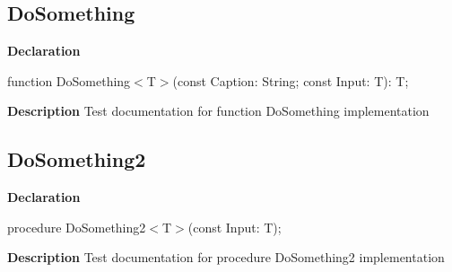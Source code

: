\documentclass{report}
\begin{document}
\subsection*{DoSomething}
\begin{list}{}{
\setlength{\itemindent}{0cm}
\setlength{\listparindent}{0cm}
\setlength{\leftmargin}{\evensidemargin}
\addtolength{\leftmargin}{\tmplength}
\settowidth{\labelsep}{X}
\addtolength{\leftmargin}{\labelsep}
\setlength{\labelwidth}{\tmplength}
}
\begin{flushleft}
\item[\textbf{Declaration}\hfill]
\begin{ttfamily}
function DoSomething{$<$}T{$>$}(const Caption: String; const Input: T): T;\end{ttfamily}


\end{flushleft}
\par
\item[\textbf{Description}]
Test documentation for function DoSomething implementation

\end{list}
\subsection*{DoSomething2}
\begin{list}{}{
\setlength{\itemindent}{0cm}
\setlength{\listparindent}{0cm}
\setlength{\leftmargin}{\evensidemargin}
\addtolength{\leftmargin}{\tmplength}
\settowidth{\labelsep}{X}
\addtolength{\leftmargin}{\labelsep}
\setlength{\labelwidth}{\tmplength}
}
\begin{flushleft}
\item[\textbf{Declaration}\hfill]
\begin{ttfamily}
procedure DoSomething2{$<$}T{$>$}(const Input: T);\end{ttfamily}


\end{flushleft}
\par
\item[\textbf{Description}]
Test documentation for procedure DoSomething2 implementation

\end{list}
\end{document}
